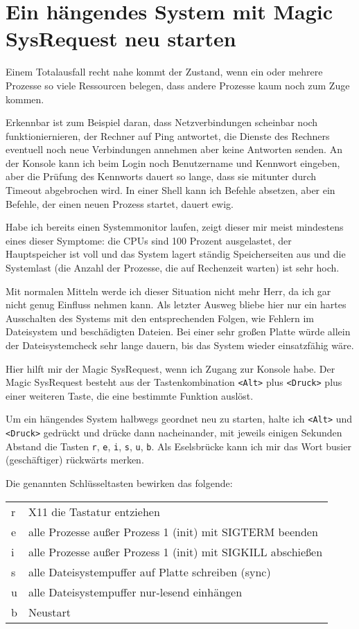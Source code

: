 \section{Ein hängendes System mit Magic SysRequest neu starten}
\label{sec:lokal-total-magic-sysrq}

Einem Totalausfall recht nahe kommt der Zustand, wenn ein oder mehrere
Prozesse so viele Ressourcen belegen, dass andere Prozesse kaum noch zum Zuge
kommen.

Erkennbar ist zum Beispiel daran, dass Netzverbindungen scheinbar noch
funktioniernieren, der Rechner auf Ping antwortet, die Dienste des Rechners
eventuell noch neue Verbindungen annehmen aber keine Antworten senden. An der
Konsole kann ich beim Login noch Benutzername und Kennwort eingeben, aber die
Prüfung des Kennworts dauert so lange, dass sie mitunter durch Timeout
abgebrochen wird. In einer Shell kann ich Befehle absetzen, aber ein Befehle,
der einen neuen Prozess startet, dauert ewig.

Habe ich bereits einen Systemmonitor laufen, zeigt dieser mir meist mindestens
eines dieser Symptome: die CPUs sind 100 Prozent ausgelastet, der
Hauptspeicher ist voll und das System lagert ständig Speicherseiten aus und
die Systemlast (die Anzahl der Prozesse, die auf Rechenzeit warten) ist sehr
hoch.

Mit normalen Mitteln werde ich dieser Situation nicht mehr Herr, da ich gar
nicht genug Einfluss nehmen kann. Als letzter Ausweg bliebe hier nur ein
hartes Ausschalten des Systems mit den entsprechenden Folgen, wie Fehlern im
Dateisystem und beschädigten Dateien. Bei einer sehr großen Platte würde
allein der Dateisystemcheck sehr lange dauern, bis das System wieder
einsatzfähig wäre.

Hier hilft mir der Magic SysRequest, wenn ich Zugang zur Konsole habe. Der
Magic SysRequest besteht aus der Tastenkombination \verb?<Alt>? plus
\verb?<Druck>? plus einer weiteren Taste, die eine bestimmte Funktion auslöst.

Um ein hängendes System halbwegs geordnet neu zu starten, halte ich
\verb?<Alt>? und \verb?<Druck>? gedrückt und drücke dann nacheinander, mit
jeweils einigen Sekunden Abstand die Tasten \verb?r?, \verb?e?, \verb?i?,
\verb?s?, \verb?u?, \verb?b?. Als Eselsbrücke kann ich mir das Wort busier
(geschäftiger) rückwärts merken.

Die genannten Schlüsseltasten bewirken das folgende:

\begin{tabular}{l|l}
  r & X11 die Tastatur entziehen \\
  e & alle Prozesse außer Prozess 1 (init) mit SIGTERM beenden \\
  i & alle Prozesse außer Prozess 1 (init) mit SIGKILL abschießen \\
  s & alle Dateisystempuffer auf Platte schreiben (sync) \\
  u & alle Dateisystempuffer nur-lesend einhängen \\
  b & Neustart \\
\end{tabular}

